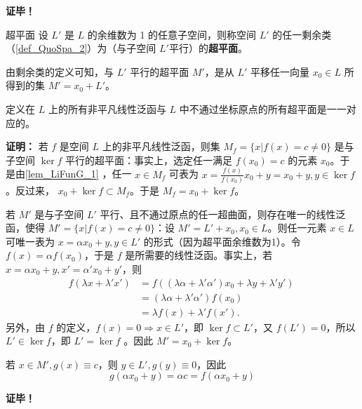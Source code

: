 \textbf{证毕！}

\begin{definition}{超平面}
设 $L'$ 是 $L$ 的余维数为 1 的任意子空间，则称空间 $L'$ 的任一剩余类（\autoref{def_QuoSpa_2}）为（与子空间 $L'$平行）的\textbf{超平面}。
\end{definition}
由剩余类的定义可知，与 $L'$ 平行的超平面 $M'$，是从 $L'$ 平移任一向量 $x_0\in L$ 所得到的集 $M'=x_0+L'$。



\begin{theorem}{}
定义在 $L$ 上的所有非平凡线性泛函与 $L$ 中不通过坐标原点的所有超平面是一一对应的。
\end{theorem}

\textbf{证明：} 若 $f$ 是空间 $L$ 上的非平凡线性泛函，则集 $M_f=\{x|f(x)=c\neq 0\}$ 是与子空间 $\ker f$ 平行的超平面：事实上，选定任一满足 $f(x_0)=c$ 的元素 $x_0$。于是由\autoref{lem_LiFunG_1} ，任一 $x\in M_f$ 可表为 $x=\frac{f(x)}{f(x_0)}x_0+y=x_0+y,y\in\ker f$。反过来， $x_0+\ker f\subset M_f$。于是 $M_f=x_0+\ker f$。

若 $M'$ 是与子空间 $L'$ 平行、且不通过原点的任一超曲面，则存在唯一的线性泛函，使得 $M'=\{x|f(x)=c\neq0\}$：设 $M'=L'+x_0,x_0\in L$。则任一元素 $x\in L$ 可唯一表为 $x=\alpha x_0+y,y\in L'$ 的形式（因为超平面余维数为1）。令 $f(x)=\alpha f(x_0)$，于是 $f$ 是所需要的线性泛函。事实上，若 $x=\alpha x_0+y,x'=\alpha' x_0+y'$，则
\begin{equation}
\begin{aligned}
f(\lambda x+\lambda' x')&=f((\lambda\alpha+\lambda'\alpha')x_0+\lambda y+\lambda'y')\\
&=(\lambda \alpha+\lambda'\alpha')f(x_0)\\
&=\lambda f(x)+\lambda'f(x').
\end{aligned}~
\end{equation}
另外，由 $f$ 的定义，$f(x)=0\Rightarrow x\in L'$，即 $\ker f\subset L'$，又 $f(L')=0$，所以 $L'\in\ker f$，即 $L'=\ker f$ 。因此 $M'=x_0+\ker f$。

若 $x\in M',g(x)\equiv c$，则 $y\in L',g(y)\equiv 0$，因此 
\begin{equation}
g(\alpha x_0+y)=\alpha c=f(\alpha x_0+y)
\end{equation}


\textbf{证毕！}



